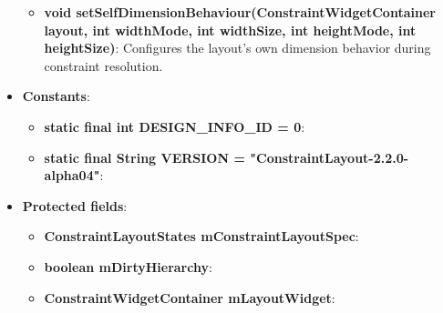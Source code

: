 \documentclass{report}
\begin{document}
\begin{itemize}
\begin{itemize}
                \item \textbf{void setSelfDimensionBehaviour(ConstraintWidgetContainer layout, int widthMode, int widthSize, int heightMode, int heightSize)}: Configures the layout’s own dimension behavior during constraint resolution.
            \end{itemize}
        \item \textbf{Constants}:
            \begin{itemize}
                \item \textbf{static final int	DESIGN\_INFO\_ID = 0}:
                \item \textbf{static final String VERSION = "ConstraintLayout-2.2.0-alpha04"}:
            \end{itemize}
        \item \textbf{Protected fields}:
            \begin{itemize}
                \item \textbf{ConstraintLayoutStates	mConstraintLayoutSpec}:
                \item \textbf{boolean	mDirtyHierarchy}:
                \item \textbf{ConstraintWidgetContainer	mLayoutWidget}:
            \end{itemize}
    \end{itemize}

    \pagebreak 
\end{document}
